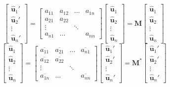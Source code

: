 \documentclass{article}      %
\newcommand{\Bu}[0]{\mathbf{u}}
\newcommand{\BM}[0]{\mathbf{M}}
\newcommand{\ucap}[1]{\hat{\Bu}_{#1}}
\begin{document}
\begin{equation*}
\begin{bmatrix}
\ucap{1}' \\
\ucap{2}' \\
\vdots	  \\
\ucap{n}'
\end{bmatrix}
=
\begin{bmatrix}
	a_{11} & a_{12} & \dots  & a_{1n} \\
        a_{21} & a_{22} & 	  &        \\
	\vdots &        & \ddots &        \\
	a_{n1} & \dots  &        & a_{nn}
\end{bmatrix}
\begin{bmatrix}
\ucap{1}  \\
\ucap{2}  \\
\vdots	  \\
\ucap{n}
\end{bmatrix}
= \BM
\begin{bmatrix}
\ucap{1}  \\
\ucap{2}  \\
\vdots	  \\
\ucap{n}
\end{bmatrix}
\end{equation*}
\begin{equation*}
\begin{bmatrix}
\ucap{1} \\
\ucap{2} \\
\vdots	  \\
\ucap{n}
\end{bmatrix}
=
\begin{bmatrix}
	\overline{a_{11}} & \overline{a_{21}} & \dots  & \overline{a_{n1}} \\
        \overline{a_{12}} & \overline{a_{22}} & 	  &        \\
	\vdots &        & \ddots &        \\
	\overline{a_{1n}} & \dots  &        & \overline{a_{nn}}
\end{bmatrix}
\begin{bmatrix}
\ucap{1}' \\
\ucap{2}' \\
\vdots	  \\
\ucap{n}'
\end{bmatrix}
= \BM^*
\begin{bmatrix}
\ucap{1}' \\
\ucap{2}' \\
\vdots	  \\
\ucap{n}'
\end{bmatrix}
\end{equation*}
\end{document}

